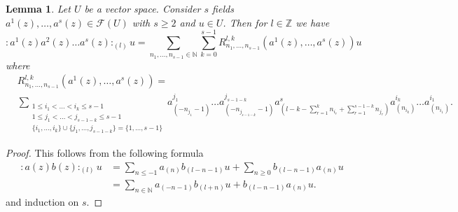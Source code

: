 \documentclass[12pt, a4paper]{article}
\newtheorem{lemma}{Lemma}
\begin{document}
\begin{lemma}
  \label{lmm:7}
  Let $U$ be a vector space.
  Consider $s$ fields $a^1(z),\dots,a^s(z)\in \mathcal{F}(U)$ with $s\ge 2$ and $u\in U$.
  Then for $l\in \mathbb{Z}$ we have
  \begin{equation*}
    :a^1(z)a^2(z)\dots a^s(z):_{(l)}u=\sum_{n_1,\dots,n_{s-1}\in \mathbb{N}}\sum_{k=0}^{s-1}R^{l,k}_{n_1,\dots,n_{s-1}}(a^1(z),\dots,a^s(z))u
  \end{equation*}
  where
  \begin{align*}
    &R^{l,k}_{n_1,\dots,n_{s-1}}(a^1(z),\dots,a^s(z))=\\
    &\sum_{\substack{1\le i_1<\dots<i_k\le s-1\\1\le j_1<\dots<j_{s-1-k}\le s-1\\\{i_1,\dots,i_k\}\cup\{j_1,\dots,j_{s-1-k}\}=\{1,\dots,s-1\}}}a^{j_1}_{(-n_{j_1}-1)}\dots a^{j_{s-1-k}}_{(-n_{j_{s-1-k}}-1)}a^s_{(l-k-\sum_{r=1}^k n_{i_r}+\sum_{r=1}^{s-1-k}n_{j_r})}a^{i_k}_{(n_{i_k})}\dots a^{i_1}_{(n_{i_1})}.
  \end{align*}
\end{lemma}
\begin{proof}
  This follows from the following formula
  \begin{align*}
    :a(z)b(z):_{(l)}u&=\sum_{n\le -1}a_{(n)}b_{(l-n-1)}u+\sum_{n\ge 0}b_{(l-n-1)}a_{(n)}u \\
    &=\sum_{n\in \mathbb{N}}a_{(-n-1)}b_{(l+n)}u+b_{(l-n-1)}a_{(n)}u.
  \end{align*}
  and induction on $s$.
\end{proof}
\end{document}
